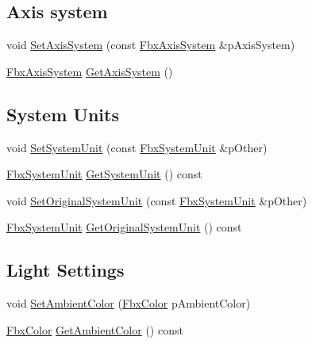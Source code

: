 \subsection*{Axis system}
\begin{DoxyCompactItemize}
\item 
void \hyperlink{class_fbx_global_settings_a91f1d5394d02d07f3a5cd9ee3df057e2}{Set\+Axis\+System} (const \hyperlink{class_fbx_axis_system}{Fbx\+Axis\+System} \&p\+Axis\+System)
\item 
\hyperlink{class_fbx_axis_system}{Fbx\+Axis\+System} \hyperlink{class_fbx_global_settings_adf26f4742b088b497a5ecec8f458e47d}{Get\+Axis\+System} ()
\end{DoxyCompactItemize}
\subsection*{System Units}
\begin{DoxyCompactItemize}
\item 
void \hyperlink{class_fbx_global_settings_a185096ada8b3c966f6f88d211a438952}{Set\+System\+Unit} (const \hyperlink{class_fbx_system_unit}{Fbx\+System\+Unit} \&p\+Other)
\item 
\hyperlink{class_fbx_system_unit}{Fbx\+System\+Unit} \hyperlink{class_fbx_global_settings_af7965a7917aa5a1545597e81ade9c1f0}{Get\+System\+Unit} () const
\item 
void \hyperlink{class_fbx_global_settings_ae95a4b4d7aa38f72a7fb4f7db79e65e6}{Set\+Original\+System\+Unit} (const \hyperlink{class_fbx_system_unit}{Fbx\+System\+Unit} \&p\+Other)
\item 
\hyperlink{class_fbx_system_unit}{Fbx\+System\+Unit} \hyperlink{class_fbx_global_settings_a5e52b2a7452a63b79b24aba5c7979e9a}{Get\+Original\+System\+Unit} () const
\end{DoxyCompactItemize}
\subsection*{Light Settings}
\begin{DoxyCompactItemize}
\item 
void \hyperlink{class_fbx_global_settings_a3b3673ef1dc899f098aff57042ff0eb9}{Set\+Ambient\+Color} (\hyperlink{class_fbx_color}{Fbx\+Color} p\+Ambient\+Color)
\item 
\hyperlink{class_fbx_color}{Fbx\+Color} \hyperlink{class_fbx_global_settings_ab44055e13f94e64cd39d4e35127d3ff0}{Get\+Ambient\+Color} () const
\end{DoxyCompactItemize}
